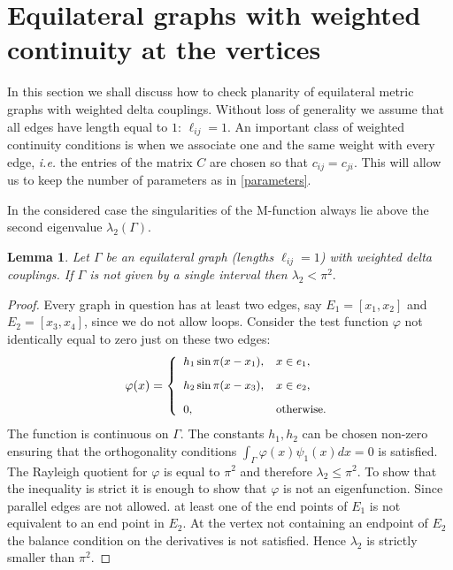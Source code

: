 \documentclass{amsart}
\newtheorem{lemma}[theorem]{Lemma}
\theoremstyle{definition}
\theoremstyle{remark}
\numberwithin{equation}{section}
\begin{document}
{\section{Equilateral graphs with weighted continuity at the vertices} \label{SecEL}


In this section we shall discuss how to check planarity of equilateral metric graphs with weighted
delta couplings. 
Without loss of generality we assume that all edges have length equal to $1$:
$ \ell_{ij} = 1 .
$
An important class of weighted continuity conditions is when we associate one and the same weight with every
edge, {\it i.e.} the entries of the matrix $ C $ are chosen so that
$
c_{ij} = c_{ji}.
$
This will allow us to keep the number of parameters 
as in \eqref{parameters}.



In the considered case the singularities of the M-function always lie above the second eigenvalue $ \lambda_2 (\Gamma).$

\begin{lemma} \label{lemmaW}
Let $\Gamma$ be an equilateral graph (lengths $\ell_{ij}=1$) with weighted delta couplings. If $\Gamma$ is not given by a single interval then
$\lambda_2<\pi^2.$
\end{lemma}
\begin{proof}
Every graph in question has at least two edges, say $ E_1 = [x_1, x_2] $ and $ E_2= [x_3, x_4] $, since we do not allow loops.
Consider the test function $ \varphi $ not identically equal to zero just on these two edges:
$$ \small \varphi (x) = \left\{
\begin{array}{ll}
h_1 \sin \pi (x-x_1), &  x \in e_1, \\[3mm]
h_2 \sin \pi (x-x_3), &  x \in e_2, \\[3mm]
0, & \mbox{otherwise}.
\end{array} \right.
$$
The function is continuous on $ \Gamma$.
The constants $ h_1, h_2 $ can be chosen non-zero ensuring that the orthogonality conditions $ \int_\Gamma \varphi (x) \psi_1 (x) dx = 0 $
is satisfied. The Rayleigh quotient for $ \varphi $ is equal to $ \pi^2$ 
and therefore $\lambda_2\leq \pi^2$. To show that the inequality is strict it is enough to show that $ \varphi $ is not an eigenfunction. Since parallel edges are not allowed.  
at least one of the end points of $ E_1 $ is not equivalent to an end point in $ E_2$. At the vertex not containing an endpoint of $E_2$ the balance condition on the derivatives is not satisfied.
Hence $ \lambda_2 $ is strictly smaller than $ \pi^2$.
\end{proof}

}
\end{document}
